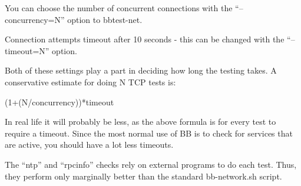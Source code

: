   You can choose the number of concurrent connections with the
  ``--concurrency=N'' option to bbtest-net. 



  Connection attempts timeout after 10 seconds - this can be changed
  with the ``--timeout=N'' option. 



  Both of these settings play a part in deciding how long the testing
  takes. A conservative estimate for doing N TCP tests is: 



  
(1+(N/concurrency))*timeout 


  In real life it will probably be less, as the above formula is for
  every test to require a timeout. Since the most normal use of BB is
  to check for services that are active, you should have a lot less
  timeouts. 



  The ``ntp'' and ``rpcinfo'' checks rely on external programs to do
  each test. Thus, they perform only marginally better than the
  standard bb-network.sh script. 



 
